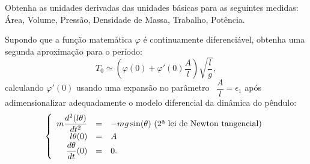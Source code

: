 \begin{exercise}
Obtenha as unidades derivadas das unidades básicas para as seguintes medidas: Área, Volume, Pressão, Densidade de Massa, Trabalho, Potência.
\end{exercise}



\begin{exercise}
Supondo que a função matemática \(\varphi\) é continuamente diferenciável, obtenha uma segunda aproximação para o período:
\begin{equation}\label{eq:aprox_freq}
T_{0} \simeq \left(\varphi(0) + \varphi'(0) \dfrac{A}{l}\right) \sqrt{\dfrac{l}{g}},
\end{equation}
calculando \(\varphi'(0)\) usando uma expansão no parâmetro \
\(\dfrac{A}{l} = \epsilon_{1}\) após adimensionalizar adequadamente o modelo diferencial da dinâmica do pêndulo:
\begin{equation}\label{eq:dif_leidenewtontang}
\left\{\begin{array}{rcl}
m \dfrac{d^2(l\theta)}{dt^{2}} &=& -mg \sin(\theta) \mbox{ (2\textordfeminine\ lei de Newton tangencial)} \\
l\theta(0) &=& A \\
\dfrac{d\theta}{dt}(0) &=& 0.
\end{array}\right.
\end{equation}
\end{exercise}

